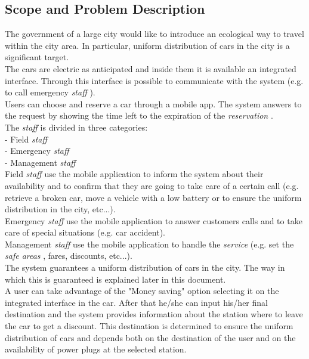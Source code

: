 \documentclass[english]{article}
\newcommand{\staff}{\textit{staff }}
\newcommand{\service}{\textit{service }}
\newcommand{\safeareas}{\textit{safe areas }}
\newcommand{\reservation}{\textit{reservation }}
\begin{document}
 \subsection{Scope and Problem Description}
 
  The government of a large city would like to introduce an ecological way to travel within the city area. In particular,     uniform distribution of cars in the city is a significant target.\\
  \tab \tab The cars are electric as anticipated and inside them it is available an integrated interface. Through this interface   is possible to communicate with the system (e.g. to call emergency \staff).\\
  \tab \tab Users can choose and reserve a car through a mobile app. The system answers to the request by showing the    time left to the expiration of the \reservation.\\
  The \staff is divided in three categories:\\
   - Field \staff\\
   - Emergency \staff\\
   - Management \staff\\
  \tab \tab Field \staff use the mobile application to inform the system about their availability and to confirm that they are    going to take care of a certain call (e.g. retrieve a broken car, move a vehicle with a low battery or to ensure the uniform    distribution in the city, etc...).\\
  \tab \tab Emergency \staff use the mobile application to answer customers calls and to take care of special situations (e.g. car accident).\\
  \tab \tab Management \staff use the mobile application to handle the \service (e.g. set the \safeareas, fares, discounts,     etc...).\\
  \tab \tab The system guarantees a uniform distribution of cars in the city. The way in which this is guaranteed is explained later in this document.   \\
  \tab \tab A user can take advantage of the "Money saving" option selecting it on the integrated interface in the car. After    that he/she can input his/her final destination and the system provides information about the station where to leave the car to get a discount. This destination is determined to ensure the uniform distribution of cars and depends both on the destination of the user and on the availability of power plugs at the selected station.
	
\end{document}
